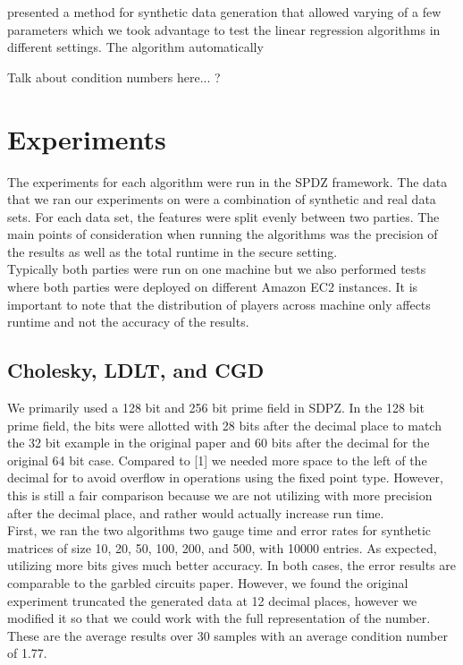 \documentclass{article}
\theoremstyle{plain}
\theoremstyle{definition}
\theoremstyle{remark}
\begin{document}
\noindent
[1] presented a method for synthetic data generation that allowed varying of a few parameters which we took advantage to test the linear regression algorithms in different settings. The algorithm automatically 

Talk about condition numbers here... ?

\section{Experiments} 

The experiments for each algorithm were run in the SPDZ framework. The data that we ran our experiments on were a combination of synthetic and real data sets. For each data set, the features were split evenly between two parties. The main points of consideration when running the algorithms was the precision of the results as well as the total runtime in the secure setting. \\

\noindent
Typically both parties were run on one machine but we also performed tests where both parties were deployed on different Amazon EC2 instances. It is important to note that the distribution of players across machine only affects runtime and not the accuracy of the results. 

\subsection{Cholesky, LDLT, and CGD}

We primarily used a 128 bit and 256 bit prime field in SDPZ. In the 128 bit prime field, the bits were allotted with 28 bits after the decimal place to match the 32 bit example in the original paper and 60 bits after the decimal for the original 64 bit case. Compared to [1] we needed more space to the left of the decimal for to avoid overflow in operations using the fixed point type. However, this is still a fair comparison because we are not utilizing with more precision after the decimal place, and rather would actually increase run time.\\

\noindent
First, we ran the two algorithms two gauge time and error rates for synthetic matrices of size 10, 20, 50, 100, 200, and 500, with 10000 entries. As expected, utilizing more bits gives much better accuracy. In both cases, the error results are comparable to the garbled circuits paper. However, we found the original experiment truncated the generated data at 12 decimal places, however we modified it so that we could work with the full representation of the number. These are the average results over 30 samples with an average condition number of 1.77.
\end{document}
